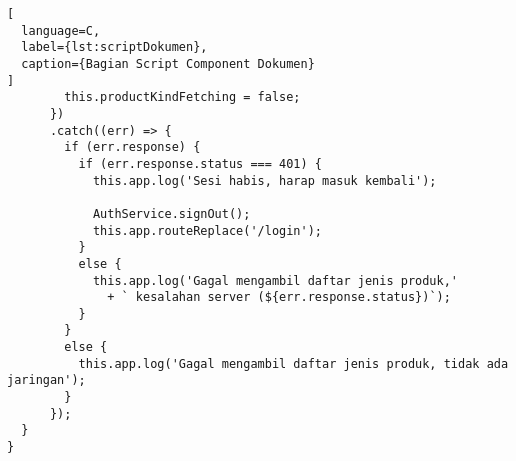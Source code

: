 \begin{lstlisting}[
  language=C,
  label={lst:scriptDokumen},
  caption={Bagian Script Component Dokumen}
]
        this.productKindFetching = false;
      })
      .catch((err) => {
        if (err.response) {
          if (err.response.status === 401) {
            this.app.log('Sesi habis, harap masuk kembali');

            AuthService.signOut();
            this.app.routeReplace('/login');
          }
          else {
            this.app.log('Gagal mengambil daftar jenis produk,'
              + ` kesalahan server (${err.response.status})`);
          }
        }
        else {
          this.app.log('Gagal mengambil daftar jenis produk, tidak ada jaringan');
        }
      });
  }
}
\end{lstlisting}
\vspace{0.5ex}
